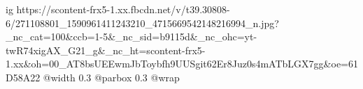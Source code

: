  
 
 
 
 

\ifcmt
  ig https://scontent-frx5-1.xx.fbcdn.net/v/t39.30808-6/271108801_1590961411243210_4715669542148216994_n.jpg?_nc_cat=100&ccb=1-5&_nc_sid=b9115d&_nc_ohc=yt-twR74xigAX_G21_g&_nc_ht=scontent-frx5-1.xx&oh=00_AT8bsUEEwmJbToybfh9UUSgit62Er8Juz0s4mATbLGX7gg&oe=61D58A22
  @width 0.3
  @parbox 0.3
  @wrap \parpic[r]
\fi

